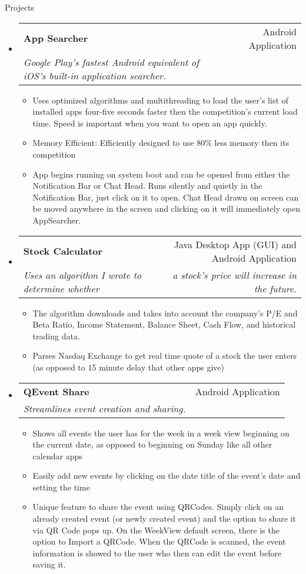 \documentclass[letterpaper,11pt]{article}
\makeatletter
\newcommand{\resitem}[1]{\item #1 \vspace{-2pt}}
\newcommand{\resheading}[1]{{\large \parashade[.9]{sharpcorners}{\textbf{#1 \vphantom{p\^{E}}}}}}
\newcommand{\ressubheading}[4]{
\begin{tabular*}{6.5in}{l@{\extracolsep{\fill}}r}
		\textbf{#1} & #2 \\
		\textit{#3} & \textit{#4} \\
\end{tabular*}\vspace{-6pt}}
\makeatother
\begin{document}
\begin{description} \item[Projects] \end{description}
\begin{itemize}

\item 
	\ressubheading{App Searcher}{Android Application}{Google Play's fastest Android equivalent of iOS's built-in application searcher.}{}
	\begin{itemize}
		\resitem{Uses optimized algorithms and multithreading to load the user's list of installed apps four-five seconds faster then the competition's current load time. Speed is important when you want to open an app quickly.}
		\resitem{Memory Efficient: Efficiently designed to use 80\% less memory then its competition}
		\resitem{App begins running on system boot and can be opened from either the Notification Bar or Chat Head. Runs silently and quietly in the Notification Bar, just click on it to open. Chat Head drawn on screen can be moved anywhere in the screen and clicking on it will immediately open AppSearcher.}
	\end{itemize}

\item
	\ressubheading{Stock Calculator}{Java Desktop App (GUI) and Android Application}{Uses an algorithm I wrote to determine whether}{a stock's price will increase in the future.\space\space\space\space\space\space\space\space\space}
	\begin{itemize}
		\resitem{The algorithm downloads and takes into account the company’s P/E and Beta Ratio, Income Statement, Balance Sheet, Cash Flow, and historical trading data.}
		\resitem{Parses Nasdaq Exchange to get real time quote of a stock the user enters (as opposed to 15 minute delay that other apps give)}
	\end{itemize}


\item
	\ressubheading{QEvent Share}{Android Application}{Streamlines event creation and sharing.}{}
	\begin{itemize}
		\resitem{Shows all events the user has for the week in a week view beginning on the current date, as opposed to beginning on Sunday like all other calendar apps}
		\resitem{Easily add new events by clicking on the date title of the event’s date and setting the time}
		\resitem{Unique feature to share the event using QRCodes. Simply click on an already created event (or newly created event) and the option to share it via QR Code pops up. On the WeekView default screen, there is the option to Import a QRCode. When the QRCode is scanned, the event information is showed to the user who then can edit the event before saving it.}
	\end{itemize}


\end{itemize}
\end{document}
